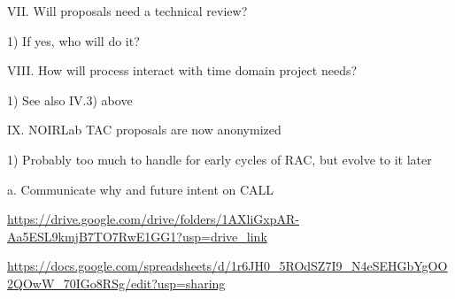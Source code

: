 VII.	Will proposals need a technical review?  


1)	If yes, who will do it?

VIII.	How will process interact with time domain project needs?


1)	See also IV.3) above

IX.	NOIRLab TAC proposals are now anonymized 


1)	Probably too much to handle for early cycles of RAC, but evolve to it later


a.	Communicate why and future intent on CALL



\url{https://drive.google.com/drive/folders/1AXliGxpAR-Aa5ESL9kmjB7TO7RwE1GG1?usp=drive_link}

\url{https://docs.google.com/spreadsheets/d/1r6JH0_5ROdSZ7I9_N4eSEHGbYgOO2QOwW_70IGo8RSg/edit?usp=sharing}


      






